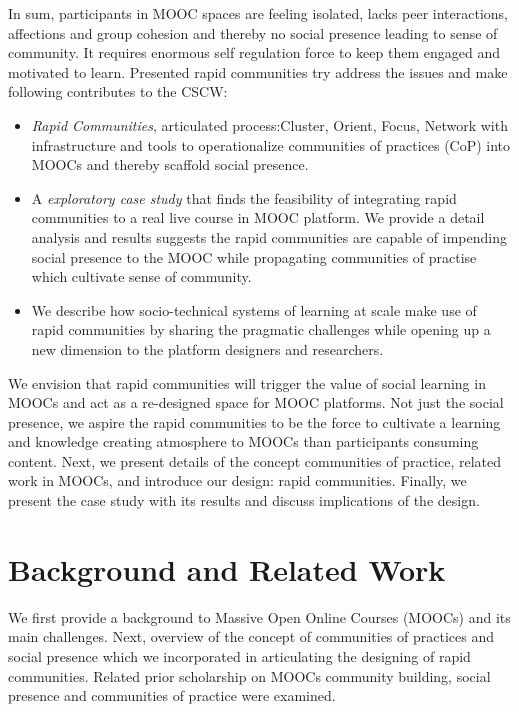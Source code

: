 \documentclass[manuscript,screen,review]{acmart}
\begin{document}
In sum, participants in MOOC spaces are feeling isolated, lacks peer interactions, affections and group cohesion  and thereby no social presence leading to sense of community. It requires enormous self regulation force to keep them engaged and motivated to learn. Presented rapid communities try address the issues and make following contributes to the CSCW: 

\begin{itemize}
\item \textit{Rapid Communities}, articulated process:Cluster, Orient, Focus, Network with infrastructure and tools to operationalize  communities of practices (CoP) into MOOCs and thereby scaffold social presence.  
\item A \textit{exploratory case study} that finds the feasibility of integrating rapid communities to a real live course in MOOC platform. We provide a detail analysis and results suggests the rapid communities are capable of impending social presence to the MOOC while propagating communities of practise which cultivate sense of community.
\item We describe how socio-technical systems of learning at scale make use of rapid communities by sharing the pragmatic challenges while opening up a new dimension to the platform designers and researchers.     
\end{itemize}

We envision that rapid communities will trigger the value of social learning in MOOCs and act as a re-designed space for MOOC platforms. Not just the social presence, we aspire the rapid communities to be the force to cultivate a learning and knowledge creating atmosphere to MOOCs than participants consuming content. Next, we present details of the concept communities of practice, related work in MOOCs, and introduce our design: rapid communities. Finally, we present the case study with its results and discuss implications of the design.

\section{Background and Related Work}
We first provide a background to Massive Open Online Courses (MOOCs) and its main challenges. Next, overview of the concept of communities of practices and social presence which we incorporated in articulating the designing of rapid communities. Related prior scholarship on MOOCs community building, social presence and communities of practice were examined. 
\end{document}
